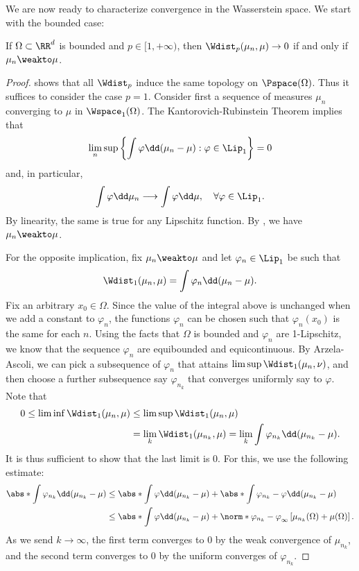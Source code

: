 \documentclass[oneside,reqno,letterpaper]{amsart}
\begin{document}
We are now ready to characterize convergence in the Wasserstein space.
We start with the bounded case:
\begin{theorem}\label{prop:Wspace-topology-bounded}
  If \(\Omega \subset \RR^d\) is bounded and \(p \in [1, +\infty)\), then \(\Wdist_p(\mu_n, \mu) \to 0\) if and only if \(\mu_n \weakto \mu\).
\end{theorem}
\begin{proof}
   shows that all \(\Wdist_p\) induce the same topology on \(\Pspace(\Omega)\).
  Thus it suffices to consider the case \(p = 1\).
  Consider first a sequence of measures \(\mu_n\) converging to \(\mu\) in \(\Wspace_1(\Omega)\).
  The Kantorovich-Rubinstein Theorem implies that
  \[
    \lim_n \sup \left\{ \int \varphi \dd (\mu_n - \mu) : \varphi \in \Lip_1 \right\} = 0
  \]
  and, in particular,
  \[
    \int \varphi \dd \mu_n \longrightarrow \int \varphi \dd \mu, \quad \forall \varphi \in \Lip_1.
  \]
  By linearity, the same is true for any Lipschitz function.
  By , we have \(\mu_n \weakto \mu\).

  For the opposite implication, fix \(\mu_n \weakto \mu\) and let \(\varphi_n \in \Lip_1\) be such that
  \[
    \Wdist_1(\mu_n, \mu)
    = \int \varphi_n \dd (\mu_n - \mu).
  \]
  Fix an arbitrary \(x_0 \in \Omega\).
  Since the value of the integral above is unchanged when we add a constant to \(\varphi_n\), the functions \(\varphi_n\) can be chosen such that \(\varphi_{n}(x_0)\) is the same for each \(n\).
  Using the facts that \(\Omega\) is bounded and \(\varphi_n\) are 1-Lipschitz, we know that the sequence \(\varphi_n\) are equibounded and equicontinuous.
  By Arzela-Ascoli, we can pick a subsequence of \(\varphi_n\) that attains \(\limsup \Wdist_1(\mu_n, \nu)\), and then choose a further subsequence say \(\varphi_{n_k}\) that converges uniformly say to \(\varphi\).
  Note that
  \begin{align*}
    0
    \leq \liminf \Wdist_1(\mu_n, \mu)
    &\leq \limsup \Wdist_1(\mu_n, \mu) \\
    &= \lim_k \Wdist_1(\mu_{n_k}, \mu)
    = \lim_k \int \varphi_{n_k} \dd (\mu_{n_k} - \mu).
  \end{align*}
  It is thus sufficient to show that the last limit is \(0\).
  For this, we use the following estimate:
  \begin{align*}
    \abs*{\int \varphi_{n_k} \dd (\mu_{n_k} - \mu)}
    &\leq \abs*{\int \varphi \dd (\mu_{n_k} - \mu)} + \abs*{\int \varphi_{n_k} - \varphi \dd (\mu_{n_k} - \mu)} \\
    &\leq \abs*{\int \varphi \dd (\mu_{n_k} - \mu)} + \norm*{\varphi_{n_k} - \varphi}_{\infty} \left[\mu_{n_k}(\Omega) + \mu(\Omega)\right].
  \end{align*}
  As we send \(k \to \infty\), the first term converges to \(0\) by the weak convergence of \(\mu_{n_k}\), and the second term converges to \(0\) by the uniform converges of \(\varphi_{n_k}\).
\end{proof}
\end{document}
